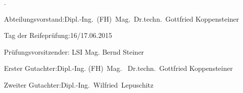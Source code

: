 \begin{titlepage}
	{\color{white}.}
	\bigskip
	\vspace{14cm}
	\noindent%

	Abteilungsvorstand:\hfill Dipl.-Ing.~(FH)\ Mag.\ Dr.techn.\ Gottfried Koppensteiner\\
	\bigskip
	\bigskip

	Tag der Reifeprüfung:\hfill 16/17.06.2015\\
	\bigskip
	\bigskip

	Prüfungsvorsitzender:\hfill
	LSI Mag. Bernd Steiner\\
	\smallskip

	Erster Gutachter:\hfill Dipl.-Ing. (FH)\ Mag. \ Dr.techn.\ Gottfried Koppensteiner\\
	\smallskip

	Zweiter Gutachter:\hfill 	Dipl.-Ing.\ Wilfried\ Lepuschitz\\
		\smallskip
\end{titlepage}

